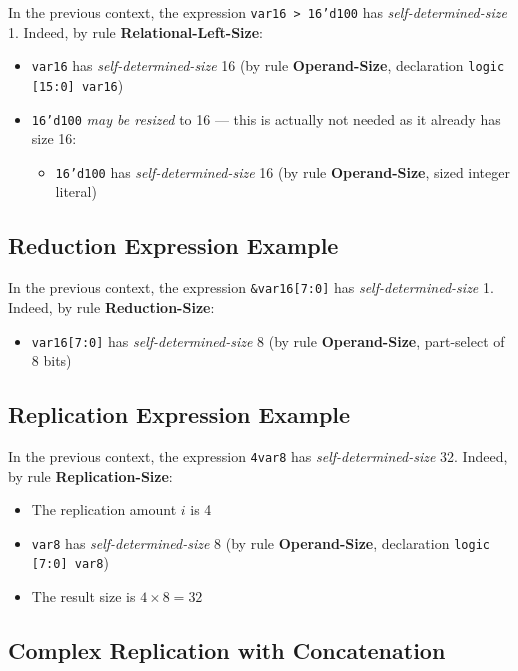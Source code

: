 \documentclass{article}
\newcommand{\sv}[1]{\texttt{#1}}
\newcommand{\sds}{\emph{self-determined-size}}
\newcommand{\mbr}{\emph{may be resized}}
\begin{document}
In the previous context, the expression \sv{var16 > 16'd100} has
\sds{} 1. Indeed, by rule \textbf{Relational-Left-Size}:

\begin{itemize}
  \item \sv{var16} has \sds{} 16 (by rule
    \textbf{Operand-Size}, declaration \sv{logic [15:0] var16})
  \item \sv{16'd100} \mbr{} to 16 --- this is actually not
    needed as it already has size 16:
    \begin{itemize}
      \item \sv{16'd100} has \sds{} 16 (by rule
        \textbf{Operand-Size}, sized integer literal)
    \end{itemize}
\end{itemize}

\subsection{Reduction Expression Example}

In the previous context, the expression \sv{&var16[7:0]} has
\sds{} 1. Indeed, by rule \textbf{Reduction-Size}:

\begin{itemize}
  \item \sv{var16[7:0]} has \sds{} 8 (by rule
    \textbf{Operand-Size}, part-select of 8 bits)
\end{itemize}

\subsection{Replication Expression Example}

In the previous context, the expression \sv{{4{var8}}} has
\sds{} 32. Indeed, by rule \textbf{Replication-Size}:

\begin{itemize}
  \item The replication amount $i$ is 4
  \item \sv{var8} has \sds{} 8 (by rule
    \textbf{Operand-Size}, declaration \sv{logic [7:0] var8})
  \item The result size is $4 \times 8 = 32$
\end{itemize}

\subsection{Complex Replication with Concatenation}
\end{document}
